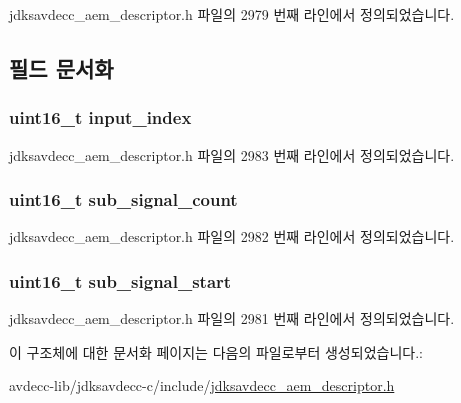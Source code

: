 jdksavdecc\+\_\+aem\+\_\+descriptor.\+h 파일의 2979 번째 라인에서 정의되었습니다.



\subsection{필드 문서화}
\subsubsection[{\texorpdfstring{input\+\_\+index}{input_index}}]{\setlength{\rightskip}{0pt plus 5cm}uint16\+\_\+t input\+\_\+index}\hypertarget{structjdksavdecc__combiner__map_a36ce6cdc96dce790b947f5dee76ac21d}{}\label{structjdksavdecc__combiner__map_a36ce6cdc96dce790b947f5dee76ac21d}


jdksavdecc\+\_\+aem\+\_\+descriptor.\+h 파일의 2983 번째 라인에서 정의되었습니다.

\subsubsection[{\texorpdfstring{sub\+\_\+signal\+\_\+count}{sub_signal_count}}]{\setlength{\rightskip}{0pt plus 5cm}uint16\+\_\+t sub\+\_\+signal\+\_\+count}\hypertarget{structjdksavdecc__combiner__map_a539ba5ac909f01c2b76e345233d20902}{}\label{structjdksavdecc__combiner__map_a539ba5ac909f01c2b76e345233d20902}


jdksavdecc\+\_\+aem\+\_\+descriptor.\+h 파일의 2982 번째 라인에서 정의되었습니다.

\subsubsection[{\texorpdfstring{sub\+\_\+signal\+\_\+start}{sub_signal_start}}]{\setlength{\rightskip}{0pt plus 5cm}uint16\+\_\+t sub\+\_\+signal\+\_\+start}\hypertarget{structjdksavdecc__combiner__map_a4277ab8f00d35ea7381d919a79324a2f}{}\label{structjdksavdecc__combiner__map_a4277ab8f00d35ea7381d919a79324a2f}


jdksavdecc\+\_\+aem\+\_\+descriptor.\+h 파일의 2981 번째 라인에서 정의되었습니다.



이 구조체에 대한 문서화 페이지는 다음의 파일로부터 생성되었습니다.\+:\begin{DoxyCompactItemize}
\item 
avdecc-\/lib/jdksavdecc-\/c/include/\hyperlink{jdksavdecc__aem__descriptor_8h}{jdksavdecc\+\_\+aem\+\_\+descriptor.\+h}\end{DoxyCompactItemize}
